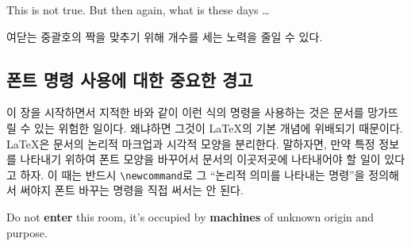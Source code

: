 \begin{example}
\begin{Large}
This is not true.
But then again, what is these
days \ldots
\end{Large}
\end{example}

\noindent 여닫는 중괄호의 짝을 맞추기 위해 개수를 세는 노력을 줄일 수 있다.

\subsection{폰트 명령 사용에 대한 중요한 경고}

이 장을 시작하면서 지적한 바와 같이 이런 식의 명령을 사용하는 것은 문서를 망가뜨릴 수 있는 위험한 일이다. 왜냐하면 그것이 \LaTeX 의 기본 개념에 위배되기 때문이다. \LaTeX 은 문서의 논리적 마크업과 시각적 모양을 분리한다. 
말하자면, 만약 특정 정보를 나타내기 위하여 폰트 모양을 바꾸어서 문서의 이곳저곳에 나타내어야 할 일이 있다고 하자. 이 때는 반드시 \verb|\newcommand|로 그 ``논리적 의미를 나타내는 명령''을 정의해서 써야지 폰트 바꾸는 명령을 직접 써서는 안 된다.


\begin{example}
\newcommand{\oops}[1]{%
 \textbf{#1}}
Do not \oops{enter} this room,
it's occupied by \oops{machines}
of unknown origin and purpose.
\end{example}

